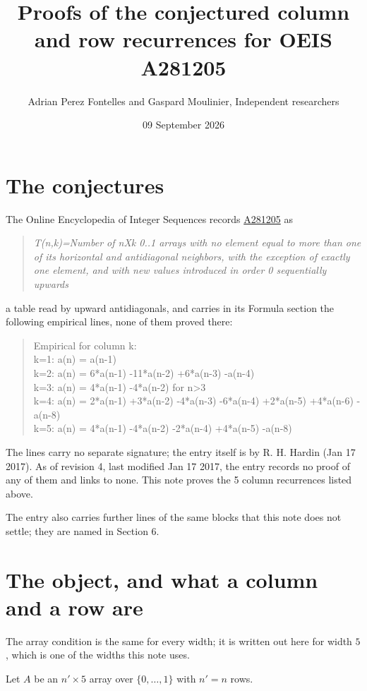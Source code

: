 \documentclass[11pt]{article}
\title{Proofs of the conjectured column and row recurrences for OEIS A281205}
\author{Adrian Perez Fontelles and Gaspard Moulinier, Independent researchers}
\date{09 September 2026}
\theoremstyle{definition}
\begin{document}
\maketitle
\section{The conjectures}

The Online Encyclopedia of Integer Sequences records \href{https://oeis.org/A281205}{A281205} as

\begin{quote}\itshape T(n,k)=Number of nXk 0..1 arrays with no element equal to more than one of its horizontal and antidiagonal neighbors, with the exception of exactly one element, and with new values introduced in order 0 sequentially upwards\end{quote}

a table read by upward antidiagonals, and carries in its Formula section the following empirical lines, none of them proved there:

\begin{quote}\ttfamily Empirical for column k:\\
k=1: a(n) = a(n-1)\\k=2: a(n) = 6*a(n-1) -11*a(n-2) +6*a(n-3) -a(n-4)\\k=3: a(n) = 4*a(n-1) -4*a(n-2) for n>3\\k=4: a(n) = 2*a(n-1) +3*a(n-2) -4*a(n-3) -6*a(n-4) +2*a(n-5) +4*a(n-6) -a(n-8)\\k=5: a(n) = 4*a(n-1) -4*a(n-2) -2*a(n-4) +4*a(n-5) -a(n-8)\end{quote}

The lines carry no separate signature; the entry itself is by R. H. Hardin (Jan 17 2017). As of revision 4, last modified Jan 17 2017, the entry records no proof of any of them and links to none. This note proves the 5 column recurrences listed above.

The entry also carries further lines of the same blocks that this note does not settle; they are named in Section 6.

\section{The object, and what a column and a row are}

The array condition is the same for every width; it is written out here for width $5$, which is one of the widths this note uses.

Let $A$ be an $n' \times 5$ array over $\{0,\dots,1\}$ with $n' = n$ rows.
\end{document}
